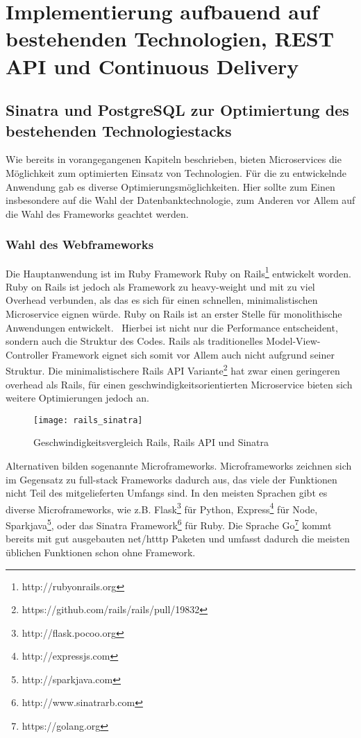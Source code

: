 \chapter{Implementierung aufbauend auf bestehenden Technologien, REST API und Continuous Delivery}

\section{Sinatra und PostgreSQL zur Optimiertung des bestehenden Technologiestacks}
Wie bereits in vorangegangenen Kapiteln beschrieben, bieten Microservices die Möglichkeit zum optimierten Einsatz von Technologien. Für die zu entwickelnde Anwendung gab es diverse Optimierungsmöglichkeiten. Hier sollte zum Einen insbesondere auf die Wahl der Datenbanktechnologie, zum Anderen vor Allem auf die Wahl des Frameworks geachtet werden.

\subsection{Wahl des Webframeworks}
Die Hauptanwendung ist im Ruby Framework Ruby on Rails\footnote{http://rubyonrails.org} entwickelt worden. Ruby on Rails ist jedoch als Framework zu heavy-weight und mit zu viel Overhead verbunden, als das es sich für einen schnellen, minimalistischen Microservice eignen würde. Ruby on Rails ist an erster Stelle für monolithische Anwendungen entwickelt.~\cite[][]{rails:doctrine}
Hierbei ist nicht nur die Performance entscheident, sondern auch die Struktur des Codes. Rails als traditionelles Model-View-Controller Framework\cite[][]{wiki:mvc} eignet sich somit vor Allem auch nicht aufgrund seiner Struktur. Die minimalistischere Rails API Variante\footnote{https://github.com/rails/rails/pull/19832} hat zwar einen geringeren overhead als Rails, für einen geschwindigkeitsorientierten Microservice bieten sich weitere Optimierungen jedoch an.

\begin{figure}[!ht]
    \centering
    \caption{Geschwindigkeitsvergleich Rails, Rails API und Sinatra \cite{newrelic:soa}}
    \label{fig:speed}
    \texttt{[image: rails\_sinatra]}
\end{figure}

Alternativen bilden sogenannte Microframeworks\cite[][]{wiki:micro}. Microframeworks zeichnen sich im Gegensatz zu full-stack Frameworks dadurch aus, das viele der Funktionen nicht Teil des mitgelieferten Umfangs sind. In den meisten Sprachen gibt es diverse Microframeworks, wie z.B. Flask\footnote{http://flask.pocoo.org} für Python, Express\footnote{http://expressjs.com} für Node, Sparkjava\footnote{http://sparkjava.com}, oder das Sinatra Framework\footnote{http://www.sinatrarb.com} für Ruby. Die Sprache Go\footnote{https://golang.org} kommt bereits mit gut ausgebauten net/htttp Paketen und umfasst dadurch die meisten üblichen Funktionen schon ohne Framework.

